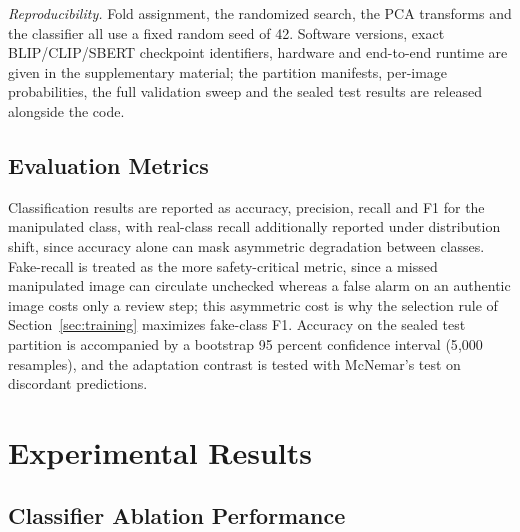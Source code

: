 \documentclass[conference,a4paper]{IEEEtran}
\begin{document}
\emph{Reproducibility.} Fold assignment, the randomized search, the PCA
transforms and the classifier all use a fixed random seed of 42. Software
versions, exact BLIP/CLIP/SBERT checkpoint identifiers, hardware and
end-to-end runtime are given in the supplementary material; the partition
manifests, per-image probabilities, the full validation sweep and the sealed
test results are released alongside the code.

\subsection{Evaluation Metrics}

Classification results are reported as accuracy, precision, recall and F1 for
the manipulated class, with real-class recall additionally reported under
distribution shift, since accuracy alone can mask asymmetric degradation
between classes. Fake-recall is treated as the more safety-critical metric,
since a missed manipulated image can circulate unchecked whereas a false alarm
on an authentic image costs only a review step; this asymmetric cost is why
the selection rule of Section~\ref{sec:training} maximizes fake-class F1.
Accuracy on the sealed test partition is accompanied by a bootstrap 95 percent
confidence interval (5{,}000 resamples), and the adaptation contrast is tested
with McNemar's test on discordant predictions.

\section{Experimental Results}

\subsection{Classifier Ablation Performance}
\label{sec:ablation}
\end{document}
